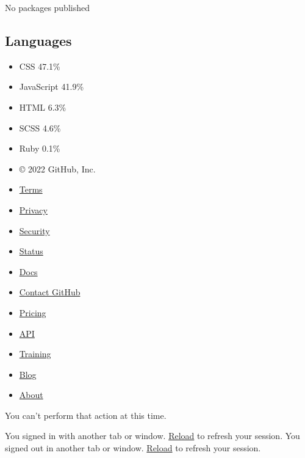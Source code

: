 \documentclass[]{article}
\providecommand{\tightlist}{%
  \setlength{\itemsep}{0pt}\setlength{\parskip}{0pt}}
\begin{document}
No packages published\\

\subsection{Languages}\label{languages}

{ {} {} {} {} {} }

\begin{itemize}
\tightlist
\item
  {CSS} {47.1\%}
\item
  {JavaScript} {41.9\%}
\item
  {HTML} {6.3\%}
\item
  {SCSS} {4.6\%}
\item
  {Ruby} {0.1\%}
\end{itemize}

\begin{itemize}
\tightlist
\item
  { © 2022 GitHub, Inc. }
\end{itemize}

\begin{itemize}
\tightlist
\item
  \href{https://docs.github.com/en/github/site-policy/github-terms-of-service}{Terms}
\item
  \href{https://docs.github.com/en/github/site-policy/github-privacy-statement}{Privacy}
\item
  \href{https://github.com/security}{Security}
\item
  \href{https://www.githubstatus.com/}{Status}
\item
  \href{https://docs.github.com}{Docs}
\item
  \href{https://support.github.com?tags=dotcom-footer}{Contact GitHub}
\item
  \href{https://github.com/pricing}{Pricing}
\item
  \href{https://docs.github.com}{API}
\item
  \href{https://services.github.com}{Training}
\item
  \href{https://github.blog}{Blog}
\item
  \href{https://github.com/about}{About}
\end{itemize}

{}

\hypertarget{ajax-error-message}{}
You can't perform that action at this time.

{You signed in with another tab or window. \href{}{Reload} to refresh
your session.} {You signed out in another tab or window. \href{}{Reload}
to refresh your session.}
\end{document}
